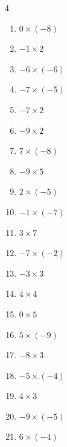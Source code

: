 \begin{multicols}{4}
\begin{enumerate}
  \item $0\times (-8)$
        \phantom{$=0$}

  \item $-1\times 2$
        \phantom{$=-2$}

  \item $-6\times (-6)$
        \phantom{$=36$}

  \item $-7\times (-5)$
        \phantom{$=35$}

  \item $-7\times 2$
        \phantom{$=-14$}

  \item $-9\times 2$
        \phantom{$=-18$}

  \item $7\times (-8)$
        \phantom{$=-56$}

  \item $-9\times 5$
        \phantom{$=-45$}

  \item $2\times (-5)$
        \phantom{$=-10$}

  \item $-1\times (-7)$
        \phantom{$=7$}

  \item $3\times 7$
        \phantom{$=21$}

  \item $-7\times (-2)$
        \phantom{$=14$}

  \item $-3\times 3$
        \phantom{$=-9$}

  \item $4\times 4$
        \phantom{$=16$}

  \item $0\times 5$
        \phantom{$=0$}

  \item $5\times (-9)$
        \phantom{$=-45$}

  \item $-8\times 3$
        \phantom{$=-24$}

  \item $-5\times (-4)$
        \phantom{$=20$}

  \item $4\times 3$
        \phantom{$=12$}

  \item $-9\times (-5)$
        \phantom{$=45$}

  \item $6\times (-4)$
        \phantom{$=-24$}


\end{enumerate}
\end{multicols}
